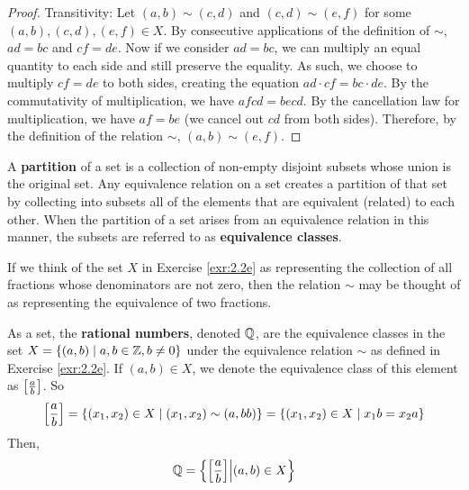 \documentclass[../main.tex]{subfiles}
\begin{document}
\begin{exercise}
\begin{enumerate}[label={\alph*)},ref={\theexercise\alph*}]
\begin{proof}
            Transitivity: Let $(a,b)\sim(c,d)$ and $(c,d)\sim(e,f)$ for some $(a,b),(c,d),(e,f)\in X$. By consecutive applications of the definition of $\sim$, $ad=bc$ and $cf=de$. Now if we consider $ad=bc$, we can multiply an equal quantity to each side and still preserve the equality. As such, we choose to multiply $cf=de$ to both sides, creating the equation $ad\cdot cf=bc\cdot de$. By the commutativity of multiplication, we have $afcd=becd$. By the cancellation law for multiplication, we have $af=be$ (we cancel out $cd$ from both sides). Therefore, by the definition of the relation $\sim$, $(a,b)\sim(e,f)$.
        \end{proof}
    \end{enumerate}
\end{exercise}

\begin{remark}\label{rmk:2.3}
    A \textbf{partition} of a set is a collection of non-empty disjoint subsets whose union is the original set. Any equivalence relation on a set creates a partition of that set by collecting into subsets all of the elements that are equivalent (related) to each other. When the partition of a set arises from an equivalence relation in this manner, the subsets are referred to as \textbf{equivalence classes}.
\end{remark}

\begin{remark}\label{rmk:2.4}
    If we think of the set $X$ in Exercise \ref{exr:2.2e} as representing the collection of all fractions whose denominators are not zero, then the relation $\sim$ may be thought of as representing the equivalence of two fractions.
\end{remark}

\begin{definition}\label{dfn:2.5}
    As a set, the \textbf{rational numbers}, denoted $\mathbb{Q}$, are the equivalence classes in the set $X=\{(a,b)\mid a,b\in\mathbb{Z},b\neq 0\}$ under the equivalence relation $\sim$ as defined in Exercise \ref{exr:2.2e}. If $(a,b)\in X$, we denote the equivalence class of this element as $\left[ \frac{a}{b} \right]$. So
    \begin{equation*}
        \left[ \frac{a}{b} \right] = \{(x_1,x_2)\in X\mid(x_1,x_2)\sim(a,bb)\}
        = \{(x_1,x_2)\in X\mid x_1b=x_2a\}
    \end{equation*}
    Then,
    \begin{equation*}
        \mathbb{Q} = \left\{\left[ \frac{a}{b} \right]\middle|(a,b)\in X\right\}
    \end{equation*}
\end{definition}
\end{document}
